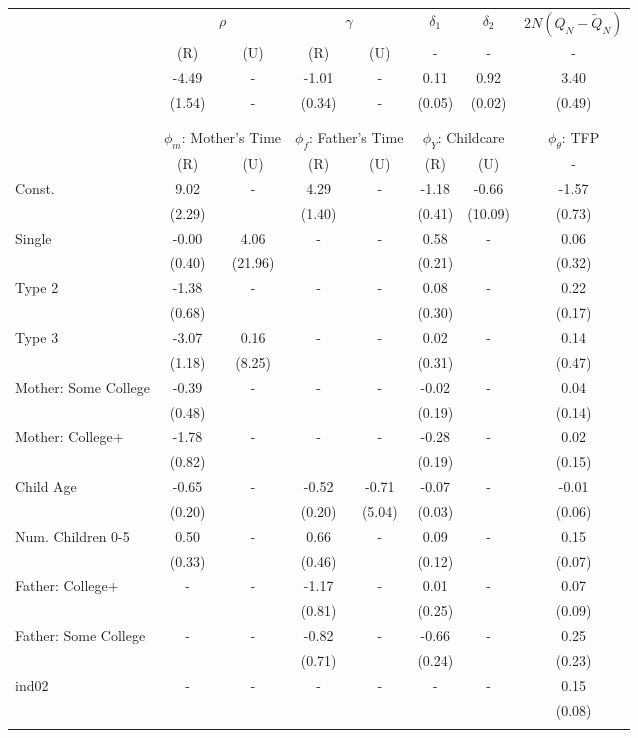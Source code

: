 \begin{tabular}{lccccccc}\toprule
 & \multicolumn{2}{c}{$\rho$} & \multicolumn{2}{c}{$\gamma$} & {$\delta_{1}$} & {$\delta_{2}$} & $2N(Q_{N} - \tilde{Q}_{N})$ \\
 & (R) & (U) & (R) & (U) & - & - & - \\\cmidrule(r){2-3}\cmidrule(r){4-5}\cmidrule(r){6-6}\cmidrule(r){7-7}\cmidrule(r){8-8}
&-4.49& - &-1.01& - &0.11&0.92&3.40\\
&(1.54)& - &(0.34)& - &(0.05)&(0.02)&(0.49)\\
\\
&&&&&&&\\
 & \multicolumn{2}{c}{$\phi_{m}$: Mother's Time} & \multicolumn{2}{c}{$\phi_{f}$: Father's Time} & \multicolumn{2}{c}{$\phi_{Y}$: Childcare} &{$\phi_{\theta}$: TFP} \\
 & (R) & (U) & (R) & (U) & (R) & (U) & -  \\\cmidrule(r){2-3}\cmidrule(r){4-5}\cmidrule(r){6-7}\cmidrule(r){8-8}
Const.&9.02& -&4.29& -&-1.18&-0.66&-1.57\\
&(2.29)&&(1.40)&&(0.41)&(10.09)&(0.73)\\
Single&-0.00&4.06& - & -&0.58& -&0.06\\
&(0.40)&(21.96) & &&(0.21)&&(0.32)\\
Type 2&-1.38& -& - & -&0.08& -&0.22\\
&(0.68)& & &&(0.30)&&(0.17)\\
Type 3&-3.07&0.16& - & -&0.02& -&0.14\\
&(1.18)&(8.25) & &&(0.31)&&(0.47)\\
Mother: Some College&-0.39& -& - & -&-0.02& -&0.04\\
&(0.48)& & &&(0.19)&&(0.14)\\
Mother: College+&-1.78& -& - & -&-0.28& -&0.02\\
&(0.82)& & &&(0.19)&&(0.15)\\
Child Age&-0.65& -&-0.52&-0.71&-0.07& -&-0.01\\
&(0.20)&&(0.20)&(5.04)&(0.03)&&(0.06)\\
Num. Children 0-5&0.50& -&0.66& -&0.09& -&0.15\\
&(0.33)&&(0.46)&&(0.12)&&(0.07)\\
Father: College+& - & -&-1.17& -&0.01& -&0.07\\
 & &&(0.81)&&(0.25)&&(0.09)\\
Father: Some College& - & -&-0.82& -&-0.66& -&0.25\\
 & &&(0.71)&&(0.24)&&(0.23)\\
ind02& - & -& - & -& - & -&0.15\\
 & & & & & &&(0.08)\\
\\
\bottomrule\end{tabular}